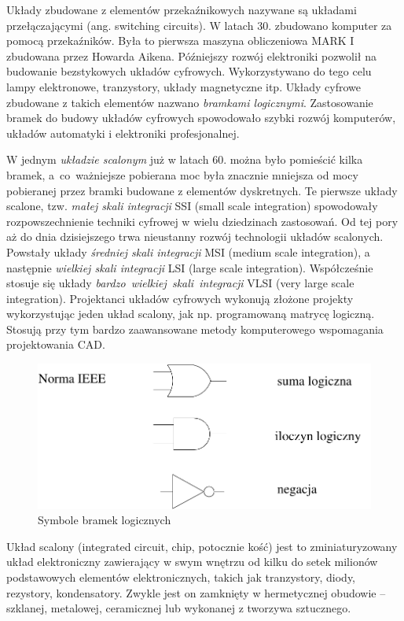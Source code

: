 \documentclass[a4paper,11pt]{article}
\begin{document}
  Układy zbudowane z elementów przekaźnikowych nazywane są układami przełączającymi (ang. switching circuits).  W latach 30. zbudowano komputer za pomocą przekaźników. Była to pierwsza maszyna obliczeniowa MARK I zbudowana przez Howarda Aikena. Późniejszy rozwój elektroniki pozwolił na budowanie bezstykowych układów cyfrowych. Wykorzystywano do tego celu lampy elektronowe, tranzystory, układy magnetyczne itp. Układy cyfrowe zbudowane z takich elementów nazwano \emph{bramkami logicznymi}. Zastosowanie bramek do budowy układów cyfrowych spowodowało szybki rozwój komputerów, układów automatyki i elektroniki profesjonalnej.
  
   W jednym \emph{układzie scalonym} już w latach 60. można było pomieścić kilka bramek, a~co~ważniejsze pobierana moc była znacznie mniejsza od mocy pobieranej przez bramki budowane z elementów dyskretnych. Te pierwsze układy scalone, tzw. \emph{małej skali integracji} SSI (small scale integration) spowodowały rozpowszechnienie techniki cyfrowej w wielu dziedzinach zastosowań. Od tej pory aż do dnia dzisiejszego trwa nieustanny rozwój technologii układów scalonych. Powstały układy \emph{średniej skali integracji} MSI (medium scale integration), a następnie \emph{wielkiej skali integracji} LSI (large scale integration). Współcześnie stosuje się układy \emph{bardzo~wielkiej~skali~integracji} VLSI (very large scale integration). Projektanci układów cyfrowych wykonują złożone projekty wykorzystując jeden układ scalony, jak np. programowaną matrycę logiczną. Stosują przy tym bardzo zaawansowane metody komputerowego wspomagania projektowania CAD.
   
\begin{figure}[!htb]
\centerline{\includegraphics[scale=0.6]{symbole-bramek.pdf}}
\caption{Symbole bramek logicznych}
\label{fig:symboleBramek}
\end{figure}

     Układ scalony (integrated circuit, chip, potocznie kość) jest to zminiaturyzowany układ elektroniczny zawierający w swym wnętrzu od kilku do setek milionów podstawowych elementów elektronicznych, takich jak tranzystory, diody, rezystory, kondensatory. Zwykle jest on zamknięty w hermetycznej obudowie -- szklanej, metalowej, ceramicznej lub wykonanej z tworzywa sztucznego.
     
\end{document}
